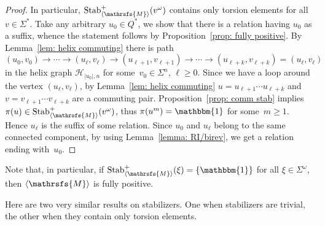 \documentclass{amsart}
\begin{document}
\begin{proof}
In particular, $\operatorname{Stab}^{+}_{{{\langle}{{\mathrsfs{{{M}}}}}{\rangle}}}(v^{\omega})$ contains only torsion elements for all $v\in {{{\Sigma}}}^{*}$. Take any arbitrary $u_0\in {{{Q}}}^{*}$, we show that there is a relation having $u_0$ as a suffix, whence the statement follows by Proposition~\ref{prop: fully positive}. By Lemma~\ref{lem: helix commuting} there is path 
$$
(u_{0},v_{0}){\longrightarrow}\cdots {\longrightarrow}(u_{\ell},v_{\ell}){\longrightarrow}(u_{\ell+1},v_{\ell+1}){\longrightarrow}\cdots {\longrightarrow}(u_{\ell+k},v_{\ell+k})=(u_{\ell},v_{\ell})
$$
in the helix graph $\mathcal{H}_{|u_0|,n}$ for some~$v_0\in {{{\Sigma}}}^{n}$, $\ell\ge
0$. Since we have a loop around the vertex $(u_{\ell},v_{\ell})$, by Lemma~\ref{lem: helix commuting} $u=u_{\ell+1}\cdots u_{\ell+k}$
and $v=v_{\ell+1}\cdots v_{\ell+k}$ are a commuting pair. Proposition~\ref{prop: comm stab} implies~$\pi(u)\in \operatorname{Stab}^{+}_{{{\langle}{{\mathrsfs{{{M}}}}}{\rangle}}}(v^{\omega})$, thus $\pi(u^{m})=\operatorname{\mathbbm{1}}$ for some~$m\ge 1$. Hence $u_{\ell}$ is the suffix of some relation. Since $u_{0}$ and $u_{\ell}$ belong to the same connected component, by using Lemma~\ref{lemma: RI/birev}, we get a relation ending with~$u_0$.
\end{proof}

Note that, in particular, if $\operatorname{Stab}^{+}_{{{\langle}{{\mathrsfs{{{M}}}}}{\rangle}}}(\xi)=\{\operatorname{\mathbbm{1}}\}$ for all $\xi\in {{{\Sigma}}}^{\omega}$, then ${{{\langle}{{\mathrsfs{{{M}}}}}{\rangle}}}$ is fully positive.

Here are two very  similar results on stabilizers. One when stabilizers are trivial, the other when they contain only torsion elements.
\end{document}
